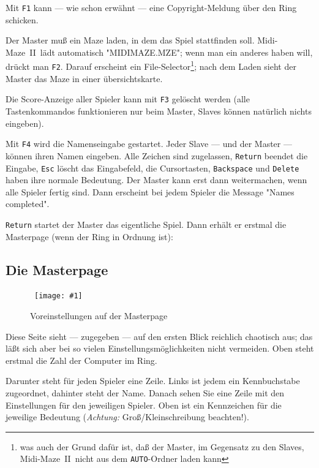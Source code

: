 \documentclass[12pt,twoside]{article}
\makeatletter
\newcommand{\mmI}{{\sc Midi-Maze}}
\newcommand{\mm}{\mmI~{\sc II}}
\newcommand{\bild}[2]{\begin{figure}[hbtp]%
\center\mbox{%
\texttt{[image: \#1]}%
}\caption{#2}\label{ab@_#1}\end{figure}}
\makeatother
\begin{document}
Mit \verb|F1| kann --- wie schon erw\"ahnt --- eine Copyright-Meldung \"uber den 
Ring schicken.


Der Master mu\ss{} ein Maze laden, in dem das Spiel stattfinden soll. \mm\ l\"adt 
automatisch "MIDIMAZE.MZE"; wenn man ein anderes haben will, dr\"uckt man 
\verb|F2|. Darauf erscheint ein File-Selector\footnote{was auch der Grund 
daf\"ur ist, da\ss{} der Master, im Gegensatz zu den Slaves, \mm\ nicht aus dem 
\texttt{AUTO}-Ordner laden kann}; nach dem Laden sieht der Master das Maze in 
einer \"ubersichtskarte.


Die Score-Anzeige aller Spieler kann mit \verb|F3| gel\"oscht werden (alle 
Tastenkommandos funktionieren nur beim Master, Slaves k\"onnen nat\"urlich 
nichts eingeben).


Mit \verb|F4| wird die Namenseingabe gestartet. Jeder Slave --- und der 
Master --- k\"onnen ihren Namen eingeben. Alle Zeichen sind zugelassen, 
\verb|Return| beendet die Eingabe, \verb|Esc| l\"oscht das Eingabefeld, die 
Cursortasten, \verb|Backspace| und \verb|Delete| haben ihre normale 
Bedeutung. Der Master kann erst dann weitermachen, wenn alle Spieler fertig 
sind. Dann erscheint bei jedem Spieler die Message "Names completed".


\verb|Return| startet der Master das eigentliche Spiel. Dann erh\"alt er 
erstmal die Masterpage (wenn der Ring in Ordnung ist):


\subsection{Die Masterpage}

\bild{masterp}{Voreinstellungen auf der Masterpage}


Diese Seite sieht --- zugegeben --- auf den ersten Blick reichlich chaotisch 
aus; das l\"a\ss{}t sich aber bei so vielen Einstellungsm\"oglichkeiten nicht 
vermeiden. Oben steht erstmal die Zahl der Computer im Ring.


Darunter steht f\"ur jeden Spieler eine Zeile. Links ist jedem ein 
Kennbuchstabe zugeordnet, dahinter steht der Name. Danach sehen Sie eine 
Zeile mit den Einstellungen f\"ur den jeweiligen Spieler. Oben ist ein 
Kennzeichen f\"ur die jeweilige Bedeutung ({\em Achtung:\/} 
Gro\ss{}/Kleinschreibung beachten!).
\end{document}
